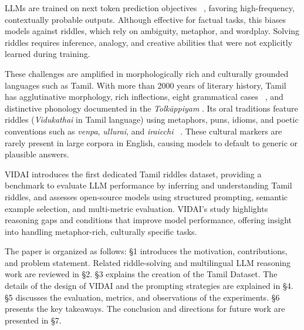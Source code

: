 \documentclass[11pt]{article}
\begin{document}
LLMs are trained on next token prediction objectives ~\cite{lin2025reasoningbiastokenprediction}, favoring high-frequency, contextually probable outputs. Although effective for factual tasks, this biases models against riddles, which rely on ambiguity, metaphor, and wordplay. Solving riddles requires inference, analogy, and creative abilities that were not explicitly learned during training.

These challenges are amplified in morphologically rich and culturally grounded languages such as Tamil. With more than 2000 years of literary history, Tamil has agglutinative morphology, rich inflections, eight grammatical cases ~\cite{lehmann1993grammar}, and distinctive phonology documented in the \textit{Tolkāppiyam} \cite{tolkappiyam}. Its oral traditions feature riddles (\textit{Vidukathai} in Tamil language) using metaphors, puns, idioms, and poetic conventions such as \textit{venpa}, \textit{ullurai}, and \textit{iraicchi} ~\cite{schiffman1999spoken,purapporulvenbamaalai}. These cultural markers are rarely present in large corpora in English, causing models to default to generic or plausible answers.

VIDAI introduces the first dedicated Tamil riddles dataset, providing a benchmark to evaluate LLM performance by inferring and understanding Tamil riddles, and assesses open-source models using structured prompting, semantic example selection, and multi-metric evaluation. VIDAI's study highlights reasoning gaps and conditions that improve model performance, offering insight into handling metaphor-rich, culturally specific tasks.

The paper is organized as follows: \S 1 introduces the motivation, contributions, and problem statement. Related riddle-solving and multilingual LLM reasoning work are reviewed in \S 2. \S 3 explains the creation of the Tamil Dataset. The details of the design of VIDAI and the prompting strategies are explained in \S 4. \S 5 discusses the evaluation,  metrics, and observations of the experiments. \S 6 presents the key takeaways. The conclusion and directions for future work are presented in \S 7.
\end{document}
